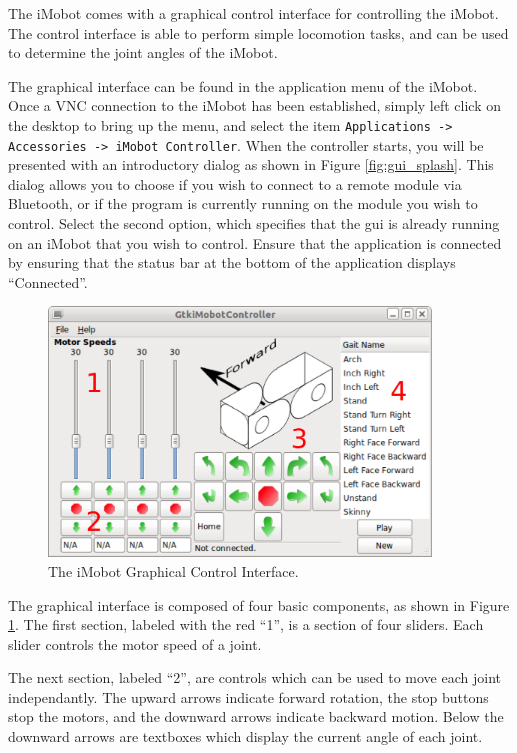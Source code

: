 \documentclass[11pt]{report}
\begin{document}
The iMobot comes with a graphical control interface for controlling the iMobot.
The control interface is able to perform simple locomotion tasks, and can be
used to determine the joint angles of the iMobot. 

The graphical interface can be found in the application menu of the iMobot. Once
a VNC connection to the iMobot has been established, simply left click on the
desktop to bring up the menu, and select the item \texttt{Applications ->
Accessories -> iMobot Controller}. When the controller starts, you will be 
presented with an introductory dialog as shown in Figure \ref{fig:gui_splash}.
This dialog allows you to choose if you wish to connect to a remote module
via Bluetooth, or if the program is currently running on the module you wish
to control. Select the second option, which specifies that the gui is already
running on an iMobot that you wish to control.
 Ensure that 
the application is connected by ensuring that the status bar at the bottom of the
application displays ``Connected''. 

\begin{figure}
\begin{center}
\includegraphics[width=4in]{gui_screenshot.png}
\caption{\label{fig:gui}The iMobot Graphical Control Interface.}
\end{center}
\end{figure}

The graphical interface is composed of four basic components, as shown in
Figure \ref{fig:gui}. The first section, labeled with the red ``1'',
is a section of four sliders. Each slider controls the motor speed of a joint.

The next section, labeled ``2'', are controls which can be used to move each
joint independantly. The upward arrows indicate forward rotation, the stop
buttons stop the motors, and the downward arrows indicate backward motion.
Below the downward arrows are textboxes which display the current angle of each
joint.
\end{document}
